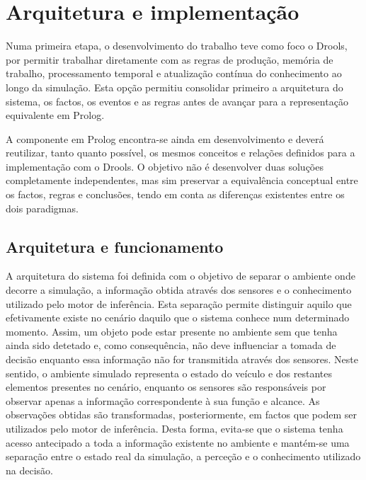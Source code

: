 \chapter{Arquitetura e implementação}
\label{cap:implementacao}

Numa primeira etapa, o desenvolvimento do trabalho teve como foco o Drools,
por permitir trabalhar diretamente com as regras de produção, memória de
trabalho, processamento temporal e atualização contínua do conhecimento ao
longo da simulação. Esta opção permitiu consolidar primeiro a arquitetura do
sistema, os factos, os eventos e as regras antes de avançar para a
representação equivalente em Prolog.

A componente em Prolog encontra-se ainda em desenvolvimento e deverá
reutilizar, tanto quanto possível, os mesmos conceitos e relações definidos
para a implementação com o Drools. O objetivo não é desenvolver duas soluções
completamente independentes, mas sim preservar a equivalência conceptual
entre os factos, regras e conclusões, tendo em conta as diferenças existentes
entre os dois paradigmas.

\section{Arquitetura e funcionamento}
\label{sec:arquitetura}

A arquitetura do sistema foi definida com o objetivo de separar o ambiente
onde decorre a simulação, a informação obtida através dos sensores e o
conhecimento utilizado pelo motor de inferência. Esta separação permite
distinguir aquilo que efetivamente existe no cenário daquilo que o sistema
conhece num determinado momento. Assim, um objeto pode estar presente no
ambiente sem que tenha ainda sido detetado e, como consequência, não deve
influenciar a tomada de decisão enquanto essa informação não for transmitida
através dos sensores. Neste sentido, o ambiente simulado representa o estado
do veículo e dos restantes elementos presentes no cenário, enquanto os
sensores são responsáveis por observar apenas a informação correspondente à
sua função e alcance. As observações obtidas são transformadas,
posteriormente, em factos que podem ser utilizados pelo motor de inferência.
Desta forma, evita-se que o sistema tenha acesso antecipado a toda a
informação existente no ambiente e mantém-se uma separação entre o estado
real da simulação, a perceção e o conhecimento utilizado na decisão.

